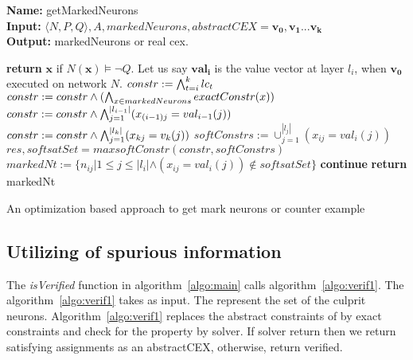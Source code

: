\begin{algorithm}[t]
  \textbf{Name: } getMarkedNeurons \\
  \textbf{Input: } $\langle N,P,Q \rangle,A,markedNeurons,abstractCEX = \boldsymbol{v_0}, \boldsymbol{v_1} ... \boldsymbol{v_k}$\\
  \textbf{Output: } markedNeurons or real cex. 
  \begin{algorithmic}[1]
    \State \textbf{return} $\boldsymbol{x}$ if $N(\boldsymbol{x}) \models \neg Q$. 
    \State Let us say $\boldsymbol{val_{i}}$ is the value vector at layer $l_i$, when $\boldsymbol{v_0}$ executed on network $N$. 
     
        \State $constr := \bigwedge_{t=i}^k lc_t$
        \State $constr := constr \land (\bigwedge_{x \in markedNeurons} exactConstr(x))$ 
        \State $constr := constr \land \bigwedge_{j=1}^{|l_{i-1}|} (x_{(i-1)j} = val_{i-1}(j))$
        \State $constr := constr \land \bigwedge_{j=1}^{|l_k|} (x_{kj} = v_k(j))$
        \State $softConstrs := \cup_{j=1}^{|l_j|} (x_{ij} = val_i(j))$
        \State $res, softsatSet = maxsoftConstr(constr, softConstrs)$ 
        \State $markedNt := \{n_{ij} | 1 \leq j \leq |l_i| \land (x_{ij} = val_i(j)) \notin  softsatSet\}$ 
          \State \textbf{continue}
        \Else
          \State \textbf{return} markedNt
        \EndIf 
      \EndIf
    \EndFor
  \end{algorithmic}
  \caption{An optimization based approach to get mark neurons or counter example}
  \label{algo:refine2}
\end{algorithm}

\subsection{Utilizing of spurious information}
The \emph{isVerified} function in algorithm~\ref{algo:main} calls algorithm~\ref{algo:verif1}. 
The algorithm~\ref{algo:verif1} takes \markednewrons{} as input. 
The \markednewrons{} represent the set of the culprit neurons. 
Algorithm~\ref{algo:verif1} replaces the abstract constraints of \markednewrons{} by exact constraints and check for the 
property by \milp{} solver. If \milp{} solver return \sat{} then we return satisfying assignments as an abstractCEX, 
otherwise, return verified. 



